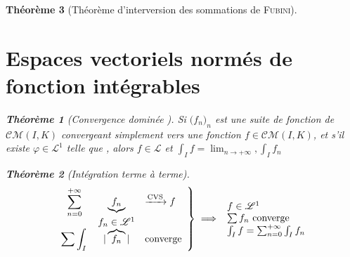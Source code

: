 \documentclass[11pt,a4paper]{report}
\newtheorem{theorem}{Théorème}[chapter]
\newtheorem{itheorem}[theorem]{Théorème}
\theoremstyle{definition}
\begin{document}
\begin{theorem}[Théorème d'interversion des sommations de \textsc{Fubini}]
{{\section{Espaces vectoriels normés de fonction intégrables}
\begin{itheorem}[Convergence dominée ]
    Si $\big( f_n \big)_n$ est une suite de fonction de $\mathcal{CM}(I,K) $ convergeant simplement vers une fonction $f \in \mathcal{CM}(I,K)$, et s'il existe $\varphi \in \mathscr{L}^1 $ telle que ,\newline
    alors $f \in \mathscr{L}$ et $\int_I f = \lim_{n \to +\infty}, \int_I f_n$
\end{itheorem}
\begin{itheorem}[Intégration terme à terme]
    \begin{equation}
        \displaystyle
        \left.
        \begin{array}{c c l}
        \displaystyle\sum_{n=0}^{+\infty} & \underbrace{f_n} & \xrightarrow{\text{CVS}} f \\
                     & f_n \in \mathscr{L}^1 & \\
        \displaystyle\sum  \int_I \vphantom{\overbrace{f_n}} & |\overbrace{f_n}| & \text{converge}
        \end{array}
        \right\rbrace 
        \implies 
        \begin{array}{l}
        f \in \mathscr{L}^1 \\
        \sum f_n \text{ converge} \\
        \int_I f = \sum_{n=0}^{+\infty} \int_I f_n
        \end{array}
    \end{equation}
\end{itheorem}
}}
\end{theorem}
\end{document}
